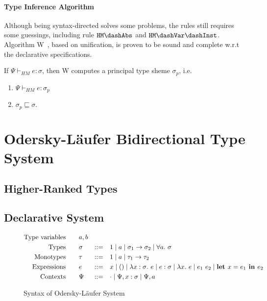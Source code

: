 \paragraph{Type Inference Algorithm}
Although being syntax-directed solves some problems, the rules still requires some guessings,
including rule $\mathtt{HM \dash Abs}$ and $\mathtt{HM \dash Var \dash Inst}$.
Algorithm W~\cite{milner1978theory}, based on unification,
is proven to be sound and complete w.r.t the declarative specifications.

\begin{theorem}
    If $\Psi \vdash_{HM} e : \sigma$, then W computes a principal type sheme $\sigma_p$, i.e.
    \begin{enumerate}
        \item $\Psi \vdash_{HM} e : \sigma_p$
        \item $\sigma_p \sqsubseteq \sigma$.
    \end{enumerate}
\end{theorem}

\section{Odersky-L\"aufer Bidirectional Type System}


\subsection{Higher-Ranked Types}


\subsection{Declarative System}

\begin{figure}[t]
    \begin{gather*}
    \begin{aligned}
        \text{Type variables}\qquad&a, b\\
        \text{Types}\qquad&\sigma &::=&\quad 1 \mid a \mid \sigma_1\to \sigma_2 \mid \all \sigma\\
        \text{Monotypes}\qquad&\tau &::=&\quad 1 \mid a \mid \tau_1\to \tau_2\\
        \text{Expressions}\qquad&e &::=&\quad x \mid () \mid \lam[x:\sigma] e
            \mid e : \sigma \mid \lam e \mid e_1~e_2 \mid \letin{e_1}{e_2}\\
        \text{Contexts}\qquad&\Psi &::=&\quad \cdot \mid \Psi, x:\sigma \mid \Psi, a
    \end{aligned}
    \end{gather*}
\caption{Syntax of Odersky-L\"aufer System}\label{fig:ol_decl_syntax}
\end{figure}

